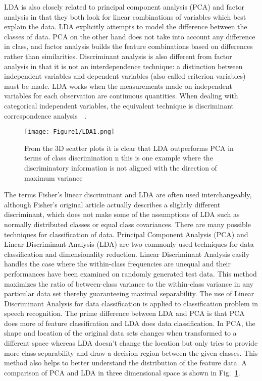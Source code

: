 LDA is also closely related to principal component analysis (PCA) and factor analysis in that they both look for linear combinations of variables which best explain the data. LDA explicitly attempts to model the difference between the classes of data. PCA on the other hand does not take into account any difference in class, and factor analysis builds the feature combinations based on differences rather than similarities. Discriminant analysis is also different from factor analysis in that it is not an interdependence technique: a distinction between independent variables and dependent variables (also called criterion variables) must be made. LDA works when the measurements made on independent variables for each observation are continuous quantities. When dealing with categorical independent variables, the equivalent technique is discriminant correspondence analysis~\cite{22}~\cite{23}.

\begin{figure}
\centering
\texttt{[image: Figure1/LDA1.png]}
\caption{From the 3D scatter plots it is clear that LDA outperforms PCA in terms of class discrimination n this is one example where the discriminatory information is not aligned with the direction of maximum variance}
\label{lad1}
\end{figure}
The terms Fisher's linear discriminant and LDA are often used interchangeably, although Fisher's original article actually describes a slightly different discriminant, which does not make some of the assumptions of LDA such as normally distributed classes or equal class covariances. There are many possible techniques for classification of data. Principal Component Analysis (PCA) and Linear Discriminant Analysis (LDA) are two commonly used techniques for data classification and dimensionality reduction. Linear Discriminant Analysis easily handles the case where the within-class frequencies are unequal and their performances have been examined on randomly generated test data. This method maximizes the ratio of between-class variance to the within-class variance in any particular data set thereby guaranteeing maximal separability. The use of Linear Discriminant Analysis for data classification is applied to classification problem in speech recognition. The prime difference between LDA and PCA is that PCA does more of feature classification and LDA does data classification. In PCA, the shape and location of the original data sets changes when transformed to a different space whereas LDA doesn’t change the location but only tries to provide more class separability and draw a decision region between the given classes. This method also helps to better understand the distribution of the feature data.
A comparison of PCA and LDA in three dimensional space is shown in Fig.~\ref{lad1}. 
